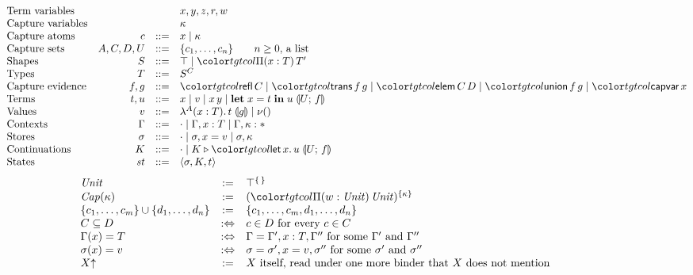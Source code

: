\begin{figure}[t]
\small
\color{tgtcol}
\[
\begin{array}{@{}lrcl@{}}
\text{Term variables} & & & x, y, z, r, w \\
\text{Capture variables} & & & \kappa \\
\text{Capture atoms} & c & ::= & x \mid \kappa \\
\text{Capture sets} & A, C, D, U & ::= & \cset{c_1, \ldots, c_n} \qquad n \ge 0 \text{, a list} \\
\text{Shapes} & S & ::= & \top \mid \pit[x]{T}{T'} \\
\text{Types} & T & ::= & \capt{S}{C} \\
\text{Capture evidence} & f, g & ::= & \ev{refl}\,C \mid \ev{trans}\,f\,g \mid \ev{elem}\,C\,D \mid \ev{union}\,f\,g \mid \ev{capvar}\,x \\
\text{Terms} & t, u & ::= & x \mid v \mid x\,y \mid \letc{x}{t}{u}{U}{f} \\
\text{Values} & v & ::= & \lamc{A}{x}{T}{t}{g} \mid \unitv \\
\text{Contexts} & \Gamma & ::= & \cdot \mid \Gamma, x : T \mid \Gamma, \kappa : \cstar \\
\text{Stores} & \sigma & ::= & \cdot \mid \sigma, x = v \mid \sigma, \kappa \\
\text{Continuations} & K & ::= & \cdot \mid K \triangleright \frlet{x}{u}{U}{f} \\
\text{States} & \mathit{st} & ::= & \mst{\sigma}{K}{t}
\end{array}
\]
\[
\begin{array}{@{}lcl@{}}
\Unit & \mathrel{:=} & \capt{\top}{\cempty} \\
\CapT{\kappa} & \mathrel{:=} & \capt{(\pit[w]{\Unit}{\Unit})}{\cset{\kappa}} \\
\cset{c_1, \ldots, c_m} \cup \cset{d_1, \ldots, d_n} & \mathrel{:=} & \cset{c_1, \ldots, c_m, d_1, \ldots, d_n} \\
C \subseteq D & \mathrel{:\Leftrightarrow} & c \in D \text{ for every } c \in C \\
\Gamma(x) = T & \mathrel{:\Leftrightarrow} & \Gamma = \Gamma', x : T, \Gamma'' \text{ for some } \Gamma' \text{ and } \Gamma'' \\
\sigma(x) = v & \mathrel{:\Leftrightarrow} & \sigma = \sigma', x = v, \sigma'' \text{ for some } \sigma' \text{ and } \sigma'' \\
\weak{X} & \mathrel{:=} & X \text{ itself, read under one more binder that } X \text{ does not mention} \\

\end{array}\]
\end{figure}
